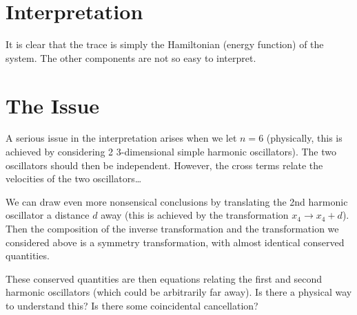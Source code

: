 \documentclass[prb,12pt]{revtex4-2}
\theoremstyle{definition}
\theoremstyle{definition}
\begin{document}
\section{Interpretation}
It is clear that the trace is simply the Hamiltonian (energy function) of the system. The other components are not so easy to interpret. 

\section{The Issue}
A serious issue in the interpretation arises when we let $n=6$ (physically, this is achieved by considering 2 3-dimensional simple harmonic oscillators). The two oscillators should then be independent. However, the cross terms relate the velocities of the two oscillators\ldots

We can draw even more nonsensical conclusions by translating the 2nd harmonic oscillator a distance $d$ away (this is achieved by the transformation $x_4\to x_4+d$). Then the composition of the inverse transformation and the transformation we considered above is a symmetry transformation, with almost identical conserved quantities. 

These conserved quantities are then equations relating the first and second harmonic oscillators (which could be arbitrarily far away). Is there a physical way to understand this? Is there some coincidental cancellation?
\end{document}
